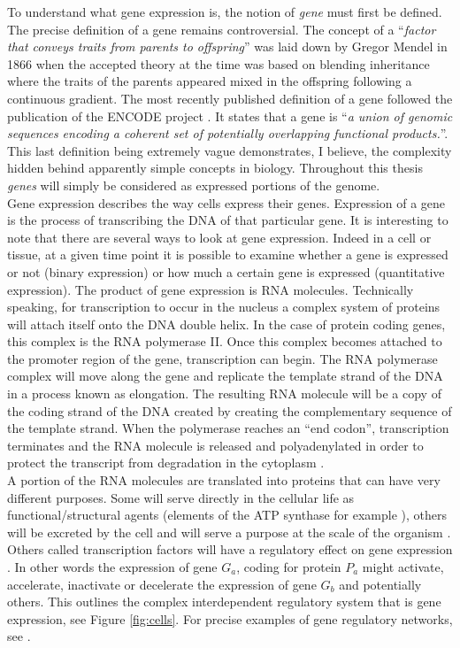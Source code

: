      To understand what gene expression is, the notion of \emph{gene} must first be defined. The precise definition of a gene remains controversial. The concept of a ``\emph{factor that conveys traits from parents to offspring}'' was laid down by Gregor Mendel in 1866 \citep{mendel66} when the accepted theory at the time was based on blending inheritance where the traits of the parents appeared mixed in the offspring following a continuous gradient. The most recently published definition of a gene followed the publication of the ENCODE project \citep{feingold04}. It states that a gene is ``\emph{a union of genomic sequences encoding a coherent set of potentially overlapping functional products.}''. This last definition being extremely vague demonstrates, I believe, the complexity hidden behind apparently simple concepts in biology. Throughout this thesis \emph{genes} will simply be considered as expressed portions of the genome.\\

	Gene expression describes the way cells express their genes. Expression of a gene is the process of transcribing the DNA of that particular gene. It is interesting to note that there are several ways to look at gene expression. Indeed in a cell or tissue, at a given time point it is possible to examine whether a gene is expressed or not (binary expression) or how much a certain gene is expressed (quantitative expression). The product of gene expression is RNA molecules. Technically speaking, for transcription to occur in the nucleus a complex system of proteins will attach itself onto the DNA double helix. In the case of protein coding genes, this complex is the RNA polymerase II. Once this complex becomes attached to the promoter region of the gene, transcription can begin. The RNA polymerase complex will move along the gene and replicate the template strand of the DNA in a process known as elongation. The resulting RNA molecule will be a copy of the coding strand of the DNA created by creating the complementary sequence of the template strand. When the polymerase reaches an ``end codon'', transcription terminates and the RNA molecule is released and polyadenylated in order to protect the transcript from degradation in the cytoplasm \citep{cooper00}.\\
	
	A portion of the RNA molecules are translated into proteins that can have very different purposes. Some will serve directly in the cellular life as functional/structural agents (elements of the ATP synthase for example \citep{boyer97}), others will be excreted by the cell and will serve a purpose at the scale of the organism \citep{kaiser84}. Others called transcription factors will have a regulatory effect on gene expression \citep{mitchell89}. In other words the expression of gene $G_a$, coding for protein $P_a$ might activate, accelerate, inactivate or decelerate the expression of gene $G_b$ and potentially others. This outlines the complex interdependent regulatory system that is gene expression, see Figure \ref{fig:cells}. For precise examples of gene regulatory networks, see \citep{gossen92, shinozaki03,fuqua01,balmer02}.\\
	
